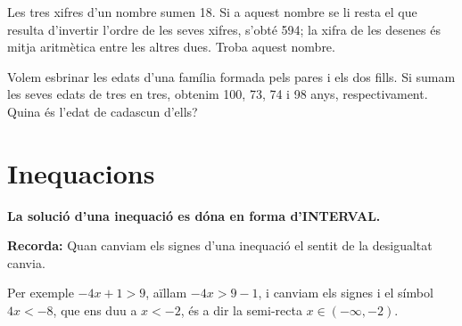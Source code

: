 \begin{mylist}
	
	\exer  Les tres xifres d'un nombre sumen 18.  Si a aquest nombre se li resta el que resulta d'invertir l'ordre de les seves xifres, s'obté 594; la xifra de les desenes és mitja aritmètica entre les altres dues. Troba aquest nombre.
	
	
	\exer  Volem esbrinar les edats d'una família formada pels pares i els dos fills. Si sumam les seves edats de tres en tres, obtenim 100, 73, 74 i 98 anys, respectivament. Quina és l'edat de cadascun d'ells?

\end{mylist}
 
\section{Inequacions}

\begin{theorybox}
	
	
	\textbf{La solució d'una inequació es dóna en forma d'INTERVAL.}
	
	\textbf{Recorda:} Quan canviam els signes d'una inequació el sentit de la desigualtat canvia.
	
	Per exemple  $-4x + 1 > 9$, aïllam $-4x > 9-1$, i canviam els signes i el símbol $4x < -8$, que ens duu a $x<-2$, és a dir la semi-recta  $x\in (-\infty, -2)$.
\end{theorybox}

